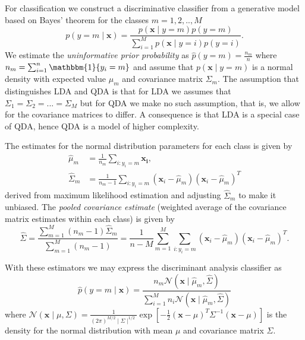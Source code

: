 \documentclass[../../project.tex]{subfiles}
\begin{document}
	For classification we construct a discriminative classifier from a generative model based on Bayes' theorem for the classes $m=1,2,..,M$
	\begin{equation}
	p(y=m \mid \boldsymbol{x}) = \frac{ p(\boldsymbol{x} \mid y=m) p(y=m)}
	{\sum_{i=1}^{M} p(\boldsymbol{x} \mid y=i)p(y=i)}.
	\end{equation}
	We estimate the \textit{uninformative prior probability} as $\hat{p}(y=m) = \frac{n_m}{n}$ where $n_m = \sum_{i=1}^{n} \mathbbm{1}\{y_i=m\}$ and assume that $p(\boldsymbol{x} \mid y=m)$ is a normal density with expected value $\mu_m$ and covariance matrix $\Sigma_m$. The assumption that distinguishes LDA and QDA is that for LDA we assumes that $\Sigma_1=\Sigma_2=...=\Sigma_M$ but for QDA we make no such assumption, that is, we allow for the covariance matrices to differ. A consequence is that LDA is a special case of QDA, hence QDA is a model of higher complexity. 
	
	The estimates for the normal distribution parameters for each class is given by
	\begin{align}
	\hat{\mu}_m &= \frac{1}{n_m} \sum_{i:y_i=m} \boldsymbol{x_i}, \\
	\hat{\Sigma}_m &= \frac{1}{n_m-1}\sum_{i:y_i=m} (\boldsymbol{x}_i-\hat{\mu}_m)(\boldsymbol{x}_i-\hat{\mu}_m)^T
	\end{align}
	derived from maximum likelihood estimation and adjusting $\hat{\Sigma}_m$ to make it unbiased. The \textit{pooled covariance estimate} (weighted average of the covariance matrix estimates within each class) is given by
	\begin{equation}
	\hat{\Sigma} = \frac{\sum_{m=1}^{M} (n_m-1)\hat{\Sigma}_m}{\sum_{m=1}^{M} (n_m-1)}=\frac{1}{n-M}\sum_{m=1}^{M}\sum_{i:y_i=m} (\boldsymbol{x}_i-\hat{\mu}_m)(\boldsymbol{x}_i-\hat{\mu}_m)^T.
	\end{equation}
	
	With these estimators we may express the discriminant analysis classifier as
	\begin{equation}
	\hat{p}(y=m \mid \boldsymbol{x}) = \frac{n_m\mathcal{N}(\boldsymbol{x} \mid \hat{\mu}_m, \hat{\Sigma})}{\sum_{i=1}^{M} n_i\mathcal{N}(\boldsymbol{x} \mid \hat{\mu}_m, \hat{\Sigma})}
	\end{equation}
	where $\mathcal{N}(\boldsymbol{x} \mid \mu,\Sigma)=\frac{1}{(2\pi)^{M/2}\mid\Sigma\mid^{1/2}}\exp{[-\frac{1}{2}(\boldsymbol{x}-\mu)^T\Sigma^{-1}(\boldsymbol{x}-\mu)]}$ is the density for the normal distribution with mean $\mu$ and covariance matrix $\Sigma$.
\end{document}

